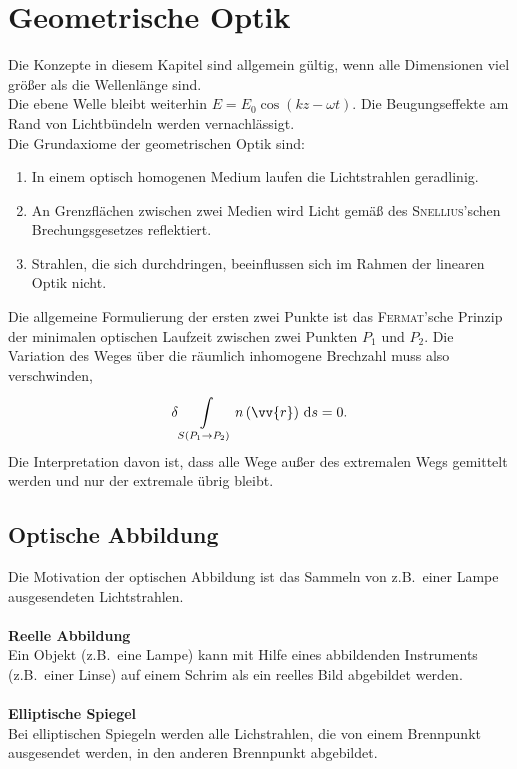 \documentclass[a4paper,12pt]{article}
\newcommand{\td}{\,\text{d}}
\numberwithin{equation}{section}
\begin{document}
\section{Geometrische Optik}
Die Konzepte in diesem Kapitel sind allgemein gültig, wenn alle Dimensionen viel größer als die Wellenlänge sind.\\\indent
Die ebene Welle bleibt weiterhin $E=E_0\cos \left(kz-\omega t\right)$. Die Beugungseffekte am Rand von Lichtbündeln werden vernachlässigt.\\\indent
Die Grundaxiome der geometrischen Optik sind:
\begin{enumerate}[label=\roman*)]
        \item In einem optisch homogenen Medium laufen die Lichtstrahlen geradlinig.
        \item An Grenzflächen zwischen zwei Medien wird Licht gemäß des \textsc{Snellius}'schen Brechungsgesetzes reflektiert.
        \item Strahlen, die sich durchdringen, beeinflussen sich im Rahmen der linearen Optik nicht.
\end{enumerate}
Die allgemeine Formulierung der ersten zwei Punkte ist das \textsc{Fermat}'sche Prinzip der minimalen optischen Laufzeit zwischen zwei Punkten $P_1$ und $P_2$. Die Variation des Weges über die räumlich inhomogene Brechzahl muss also verschwinden,
\begin{align} 
        \delta \int\limits_{S\left(P_1\rightarrow P_2\right)}^{}n\left(\vv{r}\right)\td s=0
.\end{align} 
Die Interpretation davon ist, dass alle Wege außer des extremalen Wegs gemittelt werden und nur der extremale übrig bleibt.

\subsection{Optische Abbildung}
Die Motivation der optischen Abbildung ist das Sammeln von z.B.\ einer Lampe ausgesendeten Lichtstrahlen.
\\\hfill\\\textbf{Reelle Abbildung}\\ 
Ein Objekt (z.B.\ eine Lampe) kann mit Hilfe eines abbildenden Instruments (z.B.\ einer Linse) auf einem Schrim als ein reelles Bild abgebildet werden.
\\\hfill\\\textbf{Elliptische Spiegel}\\ 
Bei elliptischen Spiegeln werden alle Lichstrahlen, die von einem Brennpunkt ausgesendet werden, in den anderen Brennpunkt abgebildet.
\end{document}
